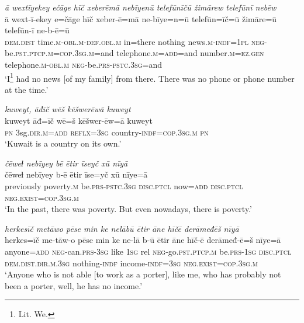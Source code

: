 \ea \label{ŽM.32}
\textit{ā wextīyekey ečāge hīč xeberēmā nebīyenū telefūnīčū žimārew telefūnī nebēw} \\ 
\gll ā wext-ī-ekey e=čāge hīč xeber-ē=mā ne-bīye=n=ū telefūn=īč=ū žimāre=ū telefūn-ī ne-b-ē=ū \\ 
 \textsc{dem.dist} time\textsc{.m}\textsc{-obl}\textsc{.m}\textsc{-def}\textsc{.obl}\textsc{.m} in=there nothing news\textsc{.m}\textsc{-indf}\textsc{=\textsc{1pl}} \textsc{neg-}be\textsc{.pst}\textsc{.ptcp}\textsc{.m}\textsc{=cop}\textsc{.3sg}\textsc{.m}=and telephone\textsc{.m}\textsc{=add}=and number\textsc{.m}\textsc{=ez.gen} telephone\textsc{.m}\textsc{-obl}\textsc{.m} \textsc{neg-}be\textsc{.prs}\textsc{-pstc}\textsc{.3sg}=and \\ 
\glt `I\footnote{Lit. We.}  had no news [of my family] from there. There was no phone or phone number at the time.'
\z 
 
\ea \label{ŽM.42}
\textit{kuweyt, āđīč wēš kēšwerēwā kuweyt} \\ 
\gll kuweyt āđ=īč wē=š kēšwer-ēw=ā kuweyt \\ 
 \textsc{pn} 3sg\textsc{.dir}\textsc{.m}\textsc{=add} \textsc{reflx}\textsc{=3sg} country\textsc{-indf}\textsc{=cop}\textsc{.3sg}\textsc{.m} \textsc{pn} \\ 
\glt `Kuwait is a country on its own.'
\z 
 
\ea \label{ŽM.56}
\textit{čēweɫ nebīyey bē ētir īseyč xū nīyā} \\ 
\gll čēweɫ nebīyey b-ē ētir īse=yč xū nīye=ā \\ 
 previously poverty\textsc{.m} be\textsc{.prs}\textsc{-pstc}\textsc{.3sg} \textsc{disc.ptcl} now\textsc{=add} \textsc{disc.ptcl} \textsc{\textsc{neg.}exist}\textsc{=cop}\textsc{.3sg}\textsc{.m} \\ 
\glt `In the past, there was poverty. But even nowadays, there is poverty.'
\z 
 
\ea \label{ŽM.62}
\textit{herkesīč metāwo pēse min ke nelābū ētir āne hīčē derāmeđēš nīyā} \\ 
\gll herkes=īč me-tāw-o pēse min ke ne-lā b-ū ētir āne hīč-ē derāmeđ-ē=š nīye=ā \\ 
 anyone\textsc{=add} \textsc{neg-}can\textsc{.prs}\textsc{-3sg} like \textsc{1sg} rel \textsc{neg-}go\textsc{.pst}\textsc{.ptcp}\textsc{.m} be\textsc{.prs}\textsc{-\textsc{1sg}} \textsc{disc.ptcl} \textsc{dem.dist}\textsc{.dir}\textsc{.m}\textsc{.3sg} nothing\textsc{-indf} income\textsc{-indf}\textsc{=3sg} \textsc{\textsc{neg.}exist}\textsc{=cop}\textsc{.3sg}\textsc{.m} \\ 
\glt `Anyone who is not able [to work as a porter], like me, who has probably not been a porter, well, he has no income.'
\z 
 

